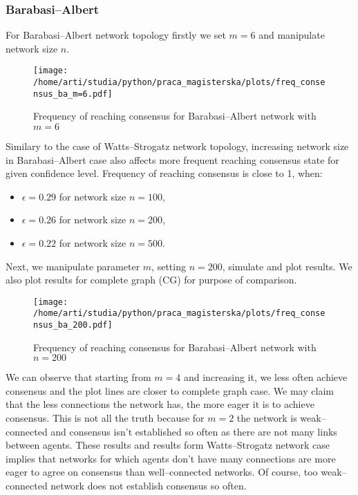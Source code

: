 \documentclass{article}
\begin{document}
\subsubsection{Barabasi--Albert}

For Barabasi--Albert network topology firstly we set $m=6$ and manipulate network size $n$.

\begin{figure}[H]
		\centering
		\texttt{[image: /home/arti/studia/python/praca\_magisterska/plots/freq\_consensus\_ba\_m=6.pdf]}
		\caption{Frequency of reaching consensus for Barabasi--Albert network with $m=6$}
\end{figure}

Similary to the case of Watts--Strogatz network topology, increasing network size in Barabasi--Albert case also affects more frequent reaching consensus state for given confidence level. Frequency of reaching consensus is close to 1, when:
\begin{itemize}
\item  $\epsilon=0.29$ for network size $n=100$,
\item  $\epsilon=0.26$ for network size $n=200$,
\item  $\epsilon=0.22$ for network size $n=500$.
\end{itemize}
\indent

Next, we manipulate parameter $m$, setting $n=200$, simulate and plot results. We also plot results for complete graph (CG) for purpose of comparison.

\begin{figure}[H]
		\centering
		\texttt{[image: /home/arti/studia/python/praca\_magisterska/plots/freq\_consensus\_ba\_200.pdf]}
		\caption{Frequency of reaching consensus for Barabasi--Albert network with $n=200$}
\end{figure}

We can observe that starting from $m=4$ and increasing it, we less often achieve consensus and the plot lines are closer to complete graph case. We may claim that the less connections the network has, the more eager it is to achieve consensus. This is not all the truth because for $m=2$ the network is weak--connected and consensus isn't established so often as there are not many links between agents. These results and results form Watts--Strogatz network case implies that networks for which agents don't have many connections are more eager to agree on consensus than well--connected networks. Of course, too weak--connected network does not establish consensus so often.
\end{document}
